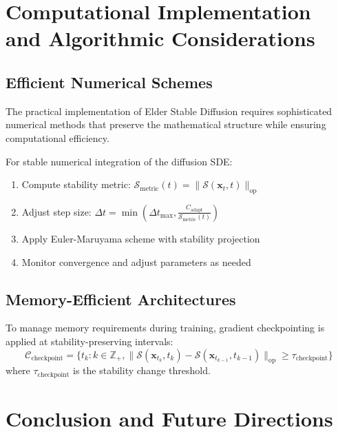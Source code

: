 \section{Computational Implementation and Algorithmic Considerations}

\subsection{Efficient Numerical Schemes}

The practical implementation of Elder Stable Diffusion requires sophisticated numerical methods that preserve the mathematical structure while ensuring computational efficiency.

\begin{algorithm}
For stable numerical integration of the diffusion SDE:
\begin{enumerate}
\item Compute stability metric: $\mathcal{S}_{\text{metric}}(t) = \|\mathcal{S}(\mathbf{x}_t, t)\|_{\text{op}}$
\item Adjust step size: $\Delta t = \min(\Delta t_{\text{max}}, \frac{C_{\text{adapt}}}{\mathcal{S}_{\text{metric}}(t)})$
\item Apply Euler-Maruyama scheme with stability projection
\item Monitor convergence and adjust parameters as needed
\end{enumerate}
\end{algorithm}

\subsection{Memory-Efficient Architectures}

\begin{definition}
To manage memory requirements during training, gradient checkpointing is applied at stability-preserving intervals:
\begin{equation}
\mathcal{C}_{\text{checkpoint}} = \{t_k : k \in \mathbb{Z}_+, \|\mathcal{S}(\mathbf{x}_{t_k}, t_k) - \mathcal{S}(\mathbf{x}_{t_{k-1}}, t_{k-1})\|_{\text{op}} \geq \tau_{\text{checkpoint}}\}
\end{equation}
where $\tau_{\text{checkpoint}}$ is the stability change threshold.
\end{definition}

\section{Conclusion and Future Directions}

